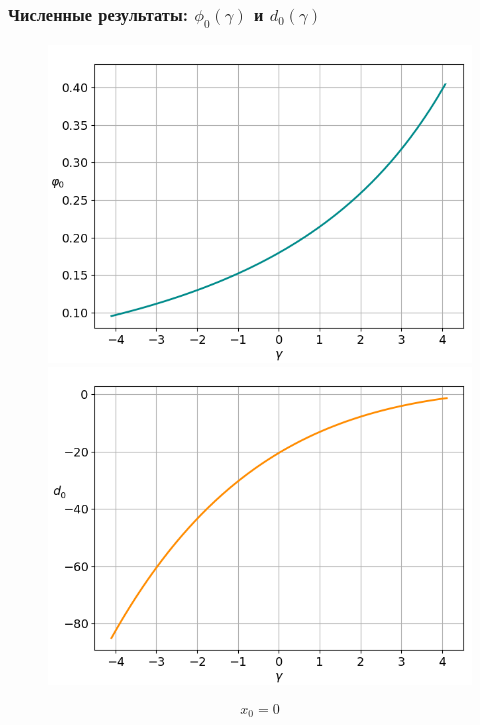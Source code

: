 \documentclass[fullscreen=true, unicode, bookmarks=false]{beamer}
\begin{document}
\begin{frame}
\frametitle{ Численные результаты: $ \phi_0(\gamma) $ и $ d_0(\gamma) $ }

\begin{figure} 
\includegraphics[scale=0.35]{oscillating_phi0_0,00.png}  
\hfill
\includegraphics[scale=0.35]{oscillating_d0_0,00.png}  
\end{figure}

$$ x_0 = 0 $$

\end{frame}
\end{document}
